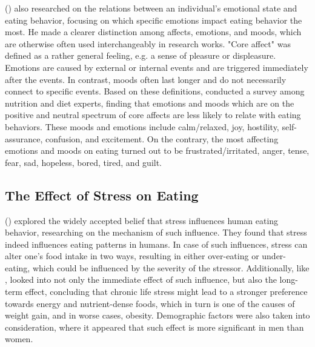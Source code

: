\noindent \citeauthor{16_martin} (\citeyear{16_martin}) also researched on the relations between an individual's emotional state and eating behavior, focusing on which specific emotions impact eating behavior the most. He made a clearer distinction among affects, emotions, and moods, which are otherwise often used interchangeably in research works. "Core affect" was defined as a rather general feeling, e.g. a sense of pleasure or displeasure. Emotions are caused by external or internal events and are triggered immediately after the events. In contrast, moods often last longer and do not necessarily connect to specific events. Based on these definitions, \citeauthor{16_martin} conducted a survey among nutrition and diet experts, finding that emotions and moods which are on the positive and neutral spectrum of core affects are less likely to relate with eating behaviors. These moods and emotions include calm/relaxed, joy, hostility, self-assurance, confusion, and excitement. On the contrary, the most affecting emotions and moods on eating turned out to be frustrated/irritated, anger, tense, fear, sad, hopeless, bored, tired, and guilt.

\subsection{The Effect of Stress on Eating}
\citeauthor{5_stress_eating} (\citeyear{5_stress_eating}) explored the widely accepted belief that stress influences human eating behavior, researching on the mechanism of such influence. They found that stress indeed influences eating patterns in humans. In case of such influences, stress can alter one's food intake in two ways, resulting in either over-eating or under-eating, which could be influenced by the severity of the stressor. Additionally, like \citeauthor{4_mood_eat}, \citeauthor{5_stress_eating} looked into not only the immediate effect of such influence, but also the long-term effect, concluding that chronic life stress might lead to a stronger preference towards energy and nutrient-dense foods, which in turn is one of the causes of weight gain, and in worse cases, obesity. Demographic factors were also taken into consideration, where it appeared that such effect is more significant in men than women.

